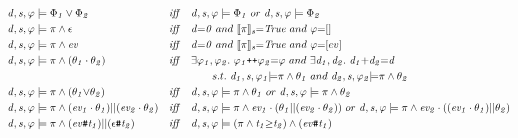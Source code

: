 \documentclass[acmsmall,10pt,review]{acmart}
\newcommand{\es}{\theta}
\newcommand{\ev}{ev}
\newcommand{\effect}{{\ensuremath{\mathrm{\Phi}}}}
\newcommand{\code}[1]{{\tt{\ensuremath{\m{#1}}}}}
\newcommand{\m}{\mathit}
\newcommand{\lappend}{\mathrel{\texttt{++}}}
\newcommand{\mysharp}{{\mathrel{\texttt{\#}}}}
\begin{document}
{\begin{figure}[!ht]
  \renewcommand{\arraystretch}{1.2}
\small\begin{align*}
&\code{d, s, \varphi \models \effect_1 \vee \effect_2}  
&\m{iff}\quad & \code{d, s, \varphi \models \effect_1 } \ 
or\ \code{d, s, \varphi \models \effect_2 }  \\
&\code{d, s,  \varphi \models {\pi} \wedge  \epsilon}  
&\m{iff}\quad & \code{d{=}0}\ and  \ \code{\llbracket {\pi} \rrbracket_s {=}  
{True} } \ and\  \code{ \varphi {=} [] }\\
&\code{d, s, \varphi \models {\pi} \wedge \ev }  
&\m{iff}\quad & \code{d{=}0}\ and  \ \code{\llbracket {\pi} \rrbracket_s {=}  
{True} }\ and \ \varphi {=} [\ev]  \\
&\code{d, s, \varphi \models {\pi} \wedge (\es_1\cdot \es_2)}  
&\m{iff}\quad & \exists \code{\varphi_1,\varphi_2}. \  
\code{ \varphi_1 {\lappend} \varphi_2 {=} \varphi}\ and\ 
\exists \code{d_1,d_2}. \  
\code{ d_1 {+} d_2 {=} d} \\
&&& \qquad  s.t. \ \code{d_1, s, \varphi_1 {\models} {\pi}  \wedge \es_1 }
\ and \ \code{d_2, s, \varphi_2 {\models} {\pi}  \wedge \es_2 }\\
&\code{d, s, \varphi \models {\pi} \wedge (\es_1{\vee}\es_2)}  
&\m{iff}\quad & 
\code{d, s, \varphi \models {\pi}  \wedge \es_1 } 
\ or\  
\code{d, s, \varphi \models {\pi}  \wedge \es_2 } \\
&\code{d, s, \varphi \models {\pi} \wedge (\ev_1 \cdot \es_1)||(\ev_2 \cdot \es_2)}  
&\m{iff}\quad & \code{d, s, \varphi \models {\pi}  \wedge \ev_1 \cdot  (\es_1||(\ev_2 \cdot \es_2)) } 
\ or\ \code{d, s, \varphi \models {\pi}  \wedge \ev_2 \cdot ((\ev_1 \cdot \es_1)||\es_2)  } \\
&\code{d, s, \varphi \models {\pi} \wedge (\ev\mysharp t_1) || (\epsilon \mysharp  t_2)}  
&\m{iff}\quad & \code{d, s, \varphi \models {(\pi \wedge t_1 {\geq}t_2)} \wedge (\ev\mysharp t_1) } 

\end{align*}
\end{figure}}
\end{document}
